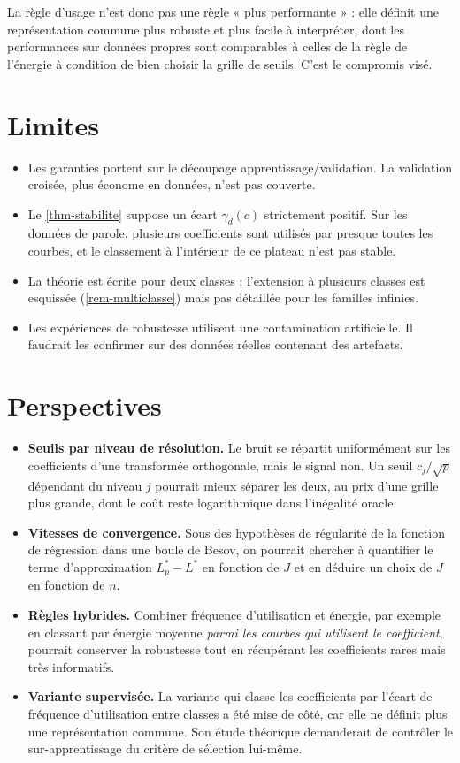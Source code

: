 La règle d'usage n'est donc pas une règle « plus performante » : elle définit une représentation commune plus robuste et plus facile à interpréter, dont les performances sur données propres sont comparables à celles de la règle de l'énergie à condition de bien choisir la grille de seuils. C'est le compromis visé.

\section{Limites}

\begin{itemize}
  \item Les garanties portent sur le découpage apprentissage/validation. La validation croisée, plus économe en données, n'est pas couverte.
  \item Le \cref{thm-stabilite} suppose un écart $\gamma_d(c)$ strictement positif. Sur les données de parole, plusieurs coefficients sont utilisés par presque toutes les courbes, et le classement à l'intérieur de ce plateau n'est pas stable.
  \item La théorie est écrite pour deux classes ; l'extension à plusieurs classes est esquissée (\cref{rem-multiclasse}) mais pas détaillée pour les familles infinies.
  \item Les expériences de robustesse utilisent une contamination artificielle. Il faudrait les confirmer sur des données réelles contenant des artefacts.
\end{itemize}

\section{Perspectives}

\begin{itemize}
  \item \textbf{Seuils par niveau de résolution.} Le bruit se répartit uniformément sur les coefficients d'une transformée orthogonale, mais le signal non. Un seuil $c_j/\sqrt p$ dépendant du niveau $j$ pourrait mieux séparer les deux, au prix d'une grille plus grande, dont le coût reste logarithmique dans l'inégalité oracle.
  \item \textbf{Vitesses de convergence.} Sous des hypothèses de régularité de la fonction de régression dans une boule de Besov, on pourrait chercher à quantifier le terme d'approximation $L^*_p-L^*$ en fonction de $J$ et en déduire un choix de $J$ en fonction de $n$.
  \item \textbf{Règles hybrides.} Combiner fréquence d'utilisation et énergie, par exemple en classant par énergie moyenne \emph{parmi les courbes qui utilisent le coefficient}, pourrait conserver la robustesse tout en récupérant les coefficients rares mais très informatifs.
  \item \textbf{Variante supervisée.} La variante qui classe les coefficients par l'écart de fréquence d'utilisation entre classes a été mise de côté, car elle ne définit plus une représentation commune. Son étude théorique demanderait de contrôler le sur-apprentissage du critère de sélection lui-même.
\end{itemize}


